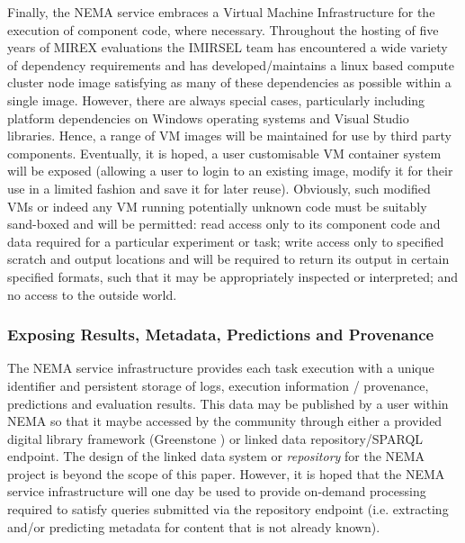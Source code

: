 \documentclass[conference]{IEEEtran}
\begin{document}
Finally, the NEMA service embraces a Virtual Machine Infrastructure for the execution of component code, where necessary. Throughout the hosting of five years of MIREX evaluations the IMIRSEL team has encountered a wide variety of dependency requirements and has developed/maintains a linux based compute cluster node image satisfying as many of these dependencies as possible within a single image. However, there are always special cases, particularly including platform dependencies on Windows operating systems and Visual Studio libraries. Hence, a range of VM images will be maintained for use by third party components.
Eventually, it is hoped, a user customisable VM container system will be exposed (allowing a user to login to an existing image, modify it for their use in a limited fashion and save it for later reuse).
Obviously, such modified VMs or indeed any VM running potentially unknown code must be suitably sand-boxed and will be permitted: read access only to its component code and data required for a particular experiment or task; write access only to specified scratch and output locations and will be required to return its output in certain specified formats, such that it may be appropriately inspected or interpreted; and no access to the outside world.

\subsubsection{Exposing Results, Metadata, Predictions and Provenance}
The NEMA service infrastructure provides each task execution with a unique identifier and persistent storage of logs, execution information / provenance, predictions and evaluation results. This data may be published by a user within NEMA so that it maybe accessed by the community through either a provided digital library framework (Greenstone \cite{witten2000greenstone}) or linked data repository/SPARQL endpoint. 
The design of the linked data system or \emph{repository} for the NEMA project is beyond the scope of this paper. However, it is hoped that the NEMA service infrastructure will one day be used to provide on-demand processing required to satisfy queries submitted via the repository endpoint (i.e. extracting and/or predicting metadata for content that is not already known).
\end{document}
